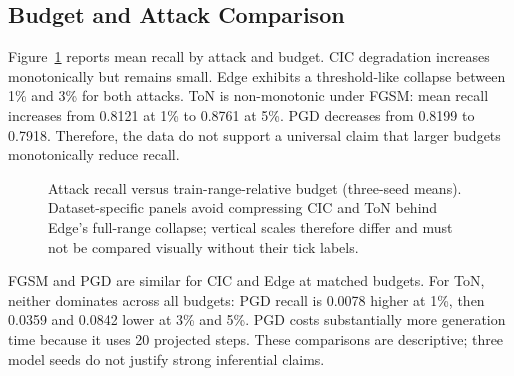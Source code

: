 \documentclass[runningheads]{llncs}
\begin{document}
\subsection{Budget and Attack Comparison}
Figure~\ref{fig:budget} reports mean recall by attack and budget. CIC degradation increases monotonically but remains small. Edge exhibits a threshold-like collapse between 1\% and 3\% for both attacks. ToN is non-monotonic under FGSM: mean recall increases from 0.8121 at 1\% to 0.8761 at 5\%. PGD decreases from 0.8199 to 0.7918. Therefore, the data do not support a universal claim that larger budgets monotonically reduce recall.

\begin{figure}[t]
\centering
{}
\caption{Attack recall versus train-range-relative budget (three-seed means). Dataset-specific panels avoid compressing CIC and ToN behind Edge's full-range collapse; vertical scales therefore differ and must not be compared visually without their tick labels.}
\label{fig:budget}
\end{figure}

FGSM and PGD are similar for CIC and Edge at matched budgets. For ToN, neither dominates across all budgets: PGD recall is 0.0078 higher at 1\%, then 0.0359 and 0.0842 lower at 3\% and 5\%. PGD costs substantially more generation time because it uses 20 projected steps. These comparisons are descriptive; three model seeds do not justify strong inferential claims.
\end{document}
